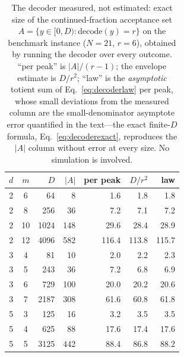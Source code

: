 \documentclass[aps,pra,reprint,superscriptaddress,nofootinbib,floatfix]{revtex4-2}
\begin{document}
\begin{table}[t]
\caption{The decoder measured, not estimated: exact size of the
continued-fraction acceptance set $A=\{y\in[0,D): \text{decode}(y)=r\}$
on the benchmark instance ($N=21$, $r=6$), obtained by running the
decoder over every outcome. ``per peak'' is $\lvert A\rvert/(r-1)$;
the envelope estimate is $D/r^2$; ``law'' is the \emph{asymptotic}
totient sum of Eq.~\eqref{eq:decoderlaw} per peak, whose small
deviations from the measured column are the small-denominator
asymptote error quantified in the text---the exact finite-$D$
formula, Eq.~\eqref{eq:decoderexact}, reproduces the
$\lvert A\rvert$ column without error at every size. No
simulation is involved.}
\label{tab:decoder}
\begin{ruledtabular}
\begin{tabular}{ccrrrrr}
$d$ & $m$ & $D$ & $\lvert A\rvert$ & per peak & $D/r^2$ & law \\
\hline
2 & 6  & 64   & 8   & 1.6   & 1.8   & 1.8   \\
2 & 8  & 256  & 36  & 7.2   & 7.1   & 7.2   \\
2 & 10 & 1024 & 148 & 29.6  & 28.4  & 28.9  \\
2 & 12 & 4096 & 582 & 116.4 & 113.8 & 115.7 \\
3 & 4  & 81   & 10  & 2.0   & 2.2   & 2.3   \\
3 & 5  & 243  & 36  & 7.2   & 6.8   & 6.9   \\
3 & 6  & 729  & 100 & 20.0  & 20.2  & 20.6  \\
3 & 7  & 2187 & 308 & 61.6  & 60.8  & 61.8  \\
5 & 3  & 125  & 16  & 3.2   & 3.5   & 3.5   \\
5 & 4  & 625  & 88  & 17.6  & 17.4  & 17.6  \\
5 & 5  & 3125 & 442 & 88.4  & 86.8  & 88.2  \\
\end{tabular}
\end{ruledtabular}
\end{table}
\end{document}
